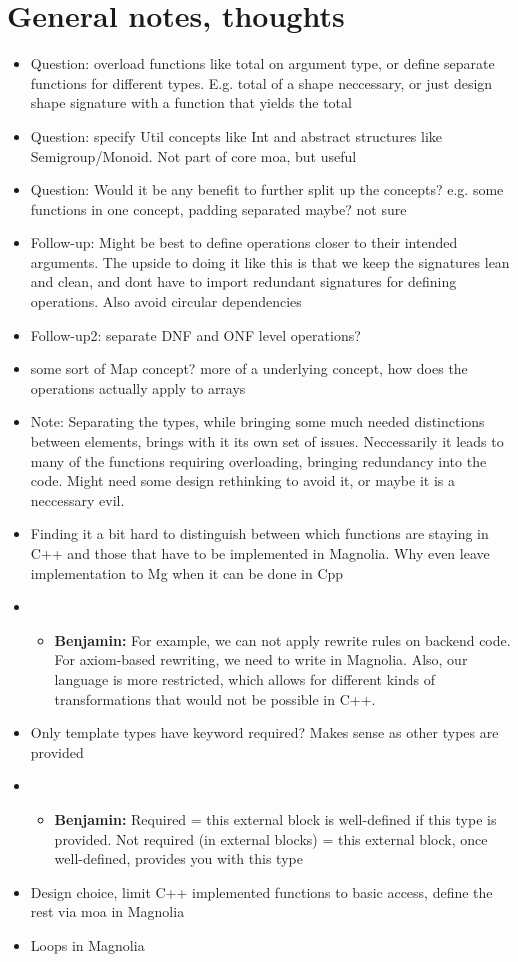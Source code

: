 \documentclass{article}
\begin{document}
\section{General notes, thoughts}

\begin{itemize}
    \item Question: overload functions like total on argument type, or define separate functions for different types. E.g. total of a shape neccessary, or just design shape signature with a function that yields the total
    \item Question: specify Util concepts like Int and abstract structures like Semigroup/Monoid. Not part of core moa, but useful
    \item Question: Would it be any benefit to further split up the concepts? e.g. some functions in one concept, padding separated maybe? not sure
    \item Follow-up: Might be best to define operations closer to their intended arguments. The upside to doing it like this is that we keep the signatures lean and clean, and dont have to import redundant signatures for defining operations. Also avoid circular dependencies
    \item Follow-up2: separate DNF and ONF level operations?
    \item some sort of Map concept? more of a underlying concept, how does the operations actually apply to arrays
    \item Note: Separating the types, while bringing some much needed distinctions between elements, brings with it its own set of issues. Neccessarily it leads to many of the functions requiring overloading, bringing redundancy into the code. Might need some design rethinking to avoid it, or maybe it is a neccessary evil.
    \item Finding it a bit hard to distinguish between which functions are staying in C++ and those that have to be implemented in Magnolia. Why even leave implementation to Mg when it can be done in Cpp
    \item \begin{itemize}
        \item \textbf{Benjamin:} For example, we can not apply rewrite rules on backend code. For axiom-based rewriting, we need to write in Magnolia. Also, our language is more restricted, which allows for different kinds of transformations that would not be possible in C++.
    \end{itemize}
    \item Only template types have keyword required? Makes sense as other types are provided
    \item \begin{itemize}
        \item \textbf{Benjamin:} Required = this external block is well-defined if this type is provided. Not required (in external blocks) = this external block, once well-defined, provides you with this type
    \end{itemize}
    \item Design choice, limit C++ implemented functions to basic access, define the rest via moa in Magnolia
    \item Loops in Magnolia
\end{itemize}
\end{document}

